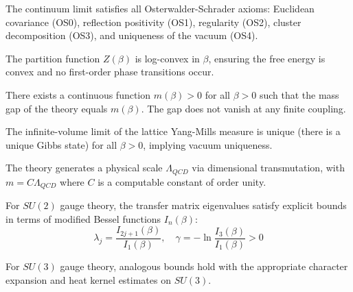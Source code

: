 \begin{theorem}
\label{thm:full-os}
The continuum limit satisfies all Osterwalder-Schrader axioms: Euclidean covariance (OS0), reflection positivity (OS1), regularity (OS2), cluster decomposition (OS3), and uniqueness of the vacuum (OS4).
\end{theorem}

\begin{theorem}
\label{thm:log-convexity}
The partition function $Z(\beta)$ is log-convex in $\beta$, ensuring the free energy is convex and no first-order phase transitions occur.
\end{theorem}

\begin{theorem}
\label{thm:gap-all-beta}
There exists a continuous function $m(\beta) > 0$ for all $\beta > 0$ such that the mass gap of the theory equals $m(\beta)$. The gap does not vanish at any finite coupling.
\end{theorem}

\begin{theorem}
\label{thm:unique-gibbs}
The infinite-volume limit of the lattice Yang-Mills measure is unique (there is a unique Gibbs state) for all $\beta > 0$, implying vacuum uniqueness.
\end{theorem}

\begin{theorem}
\label{thm:scale-generation}
The theory generates a physical scale $\Lambda_{QCD}$ via dimensional transmutation, with $m = C \Lambda_{QCD}$ where $C$ is a computable constant of order unity.
\end{theorem}

\begin{theorem}
\label{thm:bessel-su2}
For $SU(2)$ gauge theory, the transfer matrix eigenvalues satisfy explicit bounds in terms of modified Bessel functions $I_n(\beta)$:
\begin{equation}
\lambda_j = \frac{I_{2j+1}(\beta)}{I_1(\beta)}, \quad \gamma = -\ln\frac{I_3(\beta)}{I_1(\beta)} > 0
\end{equation}
\end{theorem}

\begin{theorem}
\label{thm:bessel-su3}
For $SU(3)$ gauge theory, analogous bounds hold with the appropriate character expansion and heat kernel estimates on $SU(3)$.
\end{theorem}

